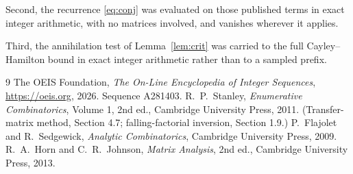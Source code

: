 \documentclass[11pt,a4paper]{article}
\theoremstyle{plain}
\theoremstyle{definition}
\begin{document}
Second, the recurrence \eqref{eq:conj} was evaluated on those published terms in exact
integer arithmetic, with no matrices involved, and vanishes wherever it applies.

Third, the annihilation test of Lemma~\ref{lem:crit} was carried to the full
Cayley--Hamilton bound in exact integer arithmetic rather than to a sampled prefix.

\begin{thebibliography}{9}
 The OEIS Foundation, \emph{The On-Line Encyclopedia of Integer
Sequences}, \url{https://oeis.org}, 2026. Sequence A281403.
 R.~P.~Stanley, \emph{Enumerative Combinatorics}, Volume 1, 2nd ed.,
Cambridge University Press, 2011. (Transfer-matrix method, Section 4.7; falling-factorial
inversion, Section 1.9.)
 P.~Flajolet and R.~Sedgewick, \emph{Analytic Combinatorics}, Cambridge
University Press, 2009.
 R.~A.~Horn and C.~R.~Johnson, \emph{Matrix Analysis}, 2nd ed., Cambridge
University Press, 2013.
\end{thebibliography}
\end{document}
